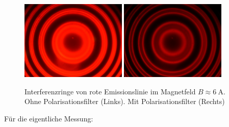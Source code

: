 	\begin{figure}[!ht]
	    \centering
	    \includegraphics[width=0.45\textwidth]{images/Capture_816.bmp.jpg}
	    \hspace{1em}
	    \includegraphics[width=0.45\textwidth]{images/Capture_815.bmp.jpg}
	    \caption{Interferenzringe von rote Emissionslinie im Magnetfeld $B \approx  \SI{6}{\ampere}$. Ohne Polarisationsfilter (Links). Mit Polarisationsfilter (Rechts)}
	    \label{fig:red-fringes-pol-B-big}
	    \vspace{-0.5em}
	\end{figure}
	\newpage
	Für die eigentliche Messung:

